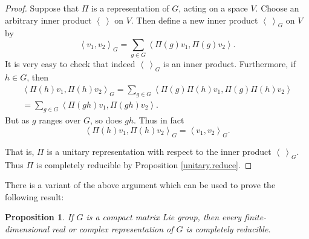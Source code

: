 \documentclass[12pt]{amsbook}
\theoremstyle{plain}
\newtheorem{proposition}[theorem]{Proposition}
\numberwithin{equation}{chapter}
\numberwithin{theorem}{chapter}
\begin{document}
\begin{proof}
Suppose that $\Pi$ is a representation of $G$, acting on a space $V$. Choose
an arbitrary inner product $\left\langle \ \right\rangle $ on $V$. Then define
a new inner product $\left\langle \ \right\rangle _{G}$ on $V$ by
\[
\left\langle v_{1},v_{2}\right\rangle _{G}=\sum_{g\in G}\left\langle
\Pi(g)v_{1},\Pi(g)v_{2}\right\rangle \text{.}%
\]
It is very easy to check that indeed $\left\langle \ \right\rangle _{G}$ is an
inner product. Furthermore, if $h\in G$, then
\begin{align*}
\left\langle \Pi(h)v_{1},\Pi(h)v_{2}\right\rangle _{G}=\sum_{g\in
G}\left\langle \Pi(g)\Pi(h)v_{1},\Pi(g)\Pi(h)v_{2}\right\rangle \\
=\sum_{g\in G}\left\langle \Pi(gh)v_{1},\Pi(gh)v_{2}\right\rangle \text{.}%
\end{align*}
But as $g$ ranges over $G$, so does $gh$. Thus in fact
\[
\left\langle \Pi(h)v_{1},\Pi(h)v_{2}\right\rangle _{G}=\left\langle
v_{1},v_{2}\right\rangle _{G}\text{.}%
\]

That is, $\Pi$ is a unitary representation with respect to the inner product
$\left\langle \ \right\rangle _{G}$. Thus $\Pi$ is completely reducible by
Proposition \ref{unitary.reduce}.
\end{proof}

There is a variant of the above argument which can be used to prove the
following result:

\begin{proposition}
\label{compact.reduce}If $G$ is a compact matrix Lie group, then every
finite-dimensional real or complex representation of $G$ is completely reducible.
\end{proposition}
\end{document}
